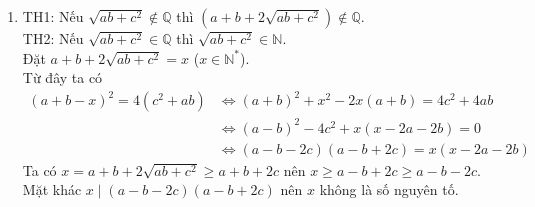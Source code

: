 \begin{ex}
{\begin{enumerate}
    	\\ Do đó $x,y$ là nghiệm của phương trình $t^2-6t+8=0 \Rightarrow \hoac{(x,y)=(2,4) \\ (x,y)=(4,2)}$.
    	\\ TH2: Nếu $x+y=24$ thay vào $(*)$ ta có $xy=\dfrac{512}{3}$ (loại).
    	\item TH1: Nếu $\sqrt{ab+c^2} \not \in \mathbb{Q}$ thì $(a+b+2\sqrt{ab+c^2}) \not \in \mathbb{Q}$.
    	\\ TH2: Nếu $\sqrt{ab+c^2} \in \mathbb{Q}$ thì $\sqrt{ab+c^2} \in \mathbb{N}$.
    	\\ Đặt $a+b+2\sqrt{ab+c^2}=x$ ($x \in \mathbb{N}^*$).
    	\\ Từ đây ta có
    	\begin{align*}
    	(a+b-x)^2=4(c^2+ab) &\Leftrightarrow (a+b)^2+x^2-2x(a+b)=4c^2+4ab \\
    	&\Leftrightarrow (a-b)^2-4c^2 + x(x-2a-2b)=0
    	\\ & \Leftrightarrow (a-b-2c)(a-b+2c)=x(x-2a-2b)
    	\end{align*}
    	Ta có $x=a+b+2\sqrt{ab+c^2} \geq a+b+2c$ nên $x \geq a-b+2c\geq a-b-2c$.
    	\\ Mặt khác $x \mid (a-b-2c)(a-b+2c)$ nên $x$ không là số nguyên tố.
    \end{enumerate}
    }
\end{ex}

